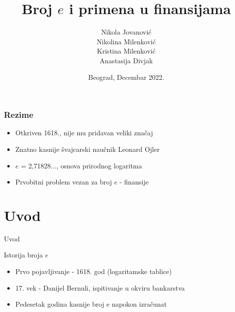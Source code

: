 \documentclass[xcolor=dvipsnames]{beamer}
\title{Broj $e$ i primena u finansijama}
\author[Jovanović, Milenković, Milenković, Divjak]{Nikola Jovanović \\ Nikolina Milenković \\  Kristina Milenković \\ Anastasija Divjak}
\institute{Univerzitet u Beogradu, Matematički fakultet}
\date{Beograd, Decembar 2022.}
\begin{document}
\begin{frame}
  \titlepage
\end{frame}

\begin{frame}
\frametitle{Rezime}
\begin{itemize}
 \item Otkriven 1618., nije mu pridavan veliki značaj
 \item Znatno kasnije švajcarski naučnik Leonard Ojler
 \item $e$ = 2,71828..., osnova prirodnog logaritma
 \item Prvobitni problem vezan za broj $e$ - finansije
\end{itemize}
\end{frame}

\section{Uvod}
\begin{frame}{Uvod}
\begin{block}{Istorija broja $e$}
    \begin{itemize}
        \item Prvo pojavljivanje - 1618. god (logaritamske tablice)
        \item 17. vek - Danijel Bernuli, ispitivanje u okviru bankarstva
        \item Pedesetak godina kasnije broj e napokon izračunat
    \end{itemize}
\end{block}
\end{frame}
\end{document}

